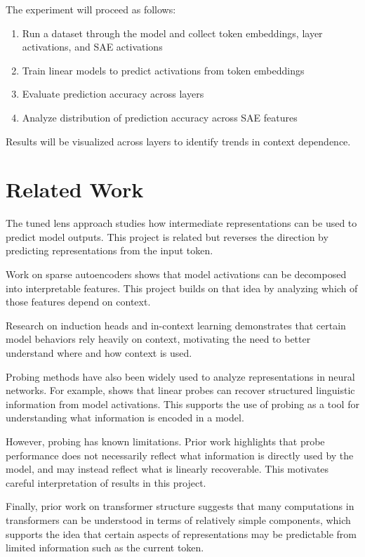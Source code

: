 \documentclass[12pt]{article}
\begin{document}
The experiment will proceed as follows:
\begin{enumerate}
    \item Run a dataset through the model and collect token embeddings, layer activations, and SAE activations
    \item Train linear models to predict activations from token embeddings
    \item Evaluate prediction accuracy across layers
    \item Analyze distribution of prediction accuracy across SAE features
\end{enumerate}

Results will be visualized across layers to identify trends in context dependence.

\section{Related Work}

The tuned lens approach \cite{belrose2023tunedlens} studies how intermediate representations can be used to predict model outputs. This project is related but reverses the direction by predicting representations from the input token.

Work on sparse autoencoders \cite{bricken2023monosemanticity} shows that model activations can be decomposed into interpretable features. This project builds on that idea by analyzing which of those features depend on context.

Research on induction heads and in-context learning \cite{olsson2022induction} demonstrates that certain model behaviors rely heavily on context, motivating the need to better understand where and how context is used.

Probing methods have also been widely used to analyze representations in neural networks. For example, \cite{hewitt2019structural} shows that linear probes can recover structured linguistic information from model activations. This supports the use of probing as a tool for understanding what information is encoded in a model.

However, probing has known limitations. Prior work \cite{alain2016understanding} highlights that probe performance does not necessarily reflect what information is directly used by the model, and may instead reflect what is linearly recoverable. This motivates careful interpretation of results in this project.

Finally, prior work on transformer structure \cite{elhage2021framework} suggests that many computations in transformers can be understood in terms of relatively simple components, which supports the idea that certain aspects of representations may be predictable from limited information such as the current token.
\end{document}
